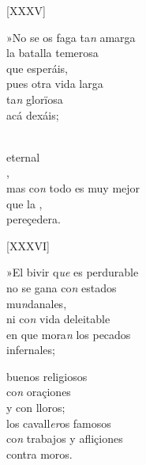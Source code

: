 \documentclass[11pt,a4paper,twoside]{article}
\begin{document}
\begin{center}
	[XXXV]
\end{center}
\pstart
»No se os faga ta\emph{n} amarga\\
la batalla temerosa\\
que esperáis,\\
pues otra vida  larga\\
 ta\emph{n} glorïosa\\ 
acá dexáis;\par
{}\\
 eternal\\
 ,\\
mas co\emph{n} todo es muy mejor\\
que la  ,\\     
pereçedera.\par
\pend

\begin{center}
	[XXXVI]
\end{center}
\pstart
»El bivir q\emph{ue} es perdurable\\
no se gana co\emph{n} estados\\ 
mu\emph{n}danales,\\
ni co\emph{n} vida deleitable\\
en que mora\emph{n} los pecados\\
infernales;\par
{} buenos religiosos\\
 co\emph{n} oraçiones\\                                           
y con lloros;\\
los cavall\emph{er}os famosos\\
co\emph{n} trabajos y afliçiones\\ 
contra moros.\par
\pend
\end{document}

